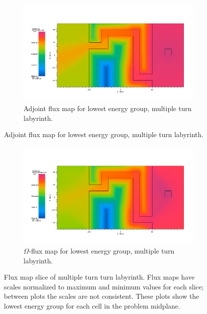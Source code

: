 \begin{figure}[htb!]
  \centering
  \begin{subfigure}[t]{\textwidth}
    \includegraphics[width=0.9\linewidth]{./chapters/characterization_probs/figures/char/maze1/maze1adjG26.png}
    \caption{Adjoint flux map for lowest energy group, multiple turn
    labyrinth.}
    \label{fig:maze1adj}
  \end{subfigure}
\end{figure}
\begin{figure}[htb!]\ContinuedFloat
  \centering
  \begin{subfigure}[t]{\textwidth}
    \includegraphics[width=0.9\linewidth]{./chapters/characterization_probs/figures/char/maze1/maze1omegaG26.png}
    \caption{$\Omega$-flux map for lowest energy group, multiple turn
    labyrinth.}
    \label{fig:maze1omega}
  \end{subfigure}
  \caption[Flux map slice of multiple turn labyrinth.]{Flux map slice of
    multiple turn
  turn labyrinth. Flux maps have scales normalized to maximum and minimum values
  for each slice; between plots the scales are not consistent. These plots show
  the lowest energy group for each cell in the problem midplane.}
  \label{fig:maze1fluxmaps}
\end{figure}


